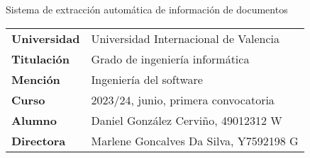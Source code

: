 \noindent
\normalfont\normalsize
Sistema de extracción automática de información de documentos
\vspace{1em}
\begin{table}[h]
    \renewcommand{\arraystretch}{1.5} %
    \begin{tabular}{p{} p{}}
        \toprule
        \textbf{Universidad} & Universidad Internacional de Valencia  \\
        \textbf{Titulación}  & Grado de ingeniería informática        \\
        \textbf{Mención}     & Ingeniería del software                \\
        \textbf{Curso}       & 2023/24, junio, primera convocatoria   \\
        \textbf{Alumno}      & Daniel González Cerviño, 49012312 W    \\
        \textbf{Directora}   & Marlene Goncalves Da Silva, Y7592198 G \\
        \bottomrule
    \end{tabular}
    \label{tab:}
\end{table}
